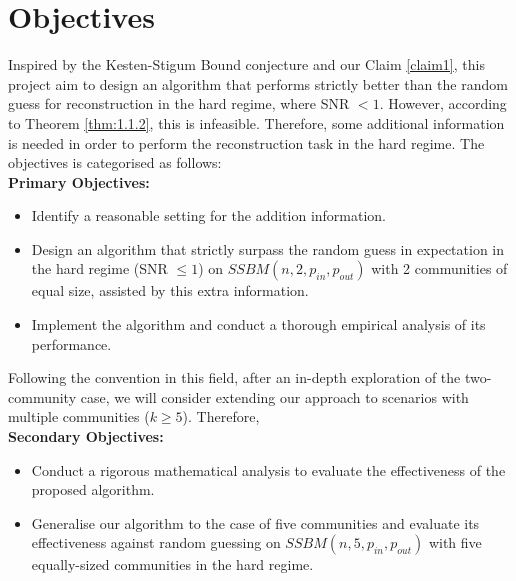 \section{Objectives}
Inspired by the Kesten-Stigum Bound conjecture and our Claim \ref{claim1}, this project aim to design an algorithm that performs strictly better than the random guess for reconstruction in the hard regime, where SNR $<1$. However, according to Theorem \ref{thm:1.1.2}, this is infeasible. Therefore, some additional information is needed in order to perform the reconstruction task in the hard regime. The objectives is categorised as follows:\vspace{2mm}\\
\textbf{Primary Objectives:}
\begin{itemize}
    \item Identify a reasonable setting for the addition information.
    \item Design an algorithm that strictly surpass the random guess in expectation in the hard regime (SNR $\leq1$) on $SSBM(n, 2, p_{in}, p_{out})$ with 2 communities of equal size, assisted by this extra information.
    \item Implement the algorithm and conduct a thorough empirical analysis of its performance.
\end{itemize}
Following the convention in this field, after an in-depth exploration of the two-community case, we will consider extending our approach to scenarios with multiple communities ($k \geq 5$). Therefore, \vspace{2mm}\\
\textbf{Secondary Objectives:}
\begin{itemize}
    \item Conduct a rigorous mathematical analysis to evaluate the effectiveness of the proposed algorithm.
    \item Generalise our algorithm to the case of five communities and evaluate its effectiveness against random guessing on $SSBM(n, 5, p_{in}, p_{out})$ with five equally-sized communities in the hard regime.
\end{itemize}
